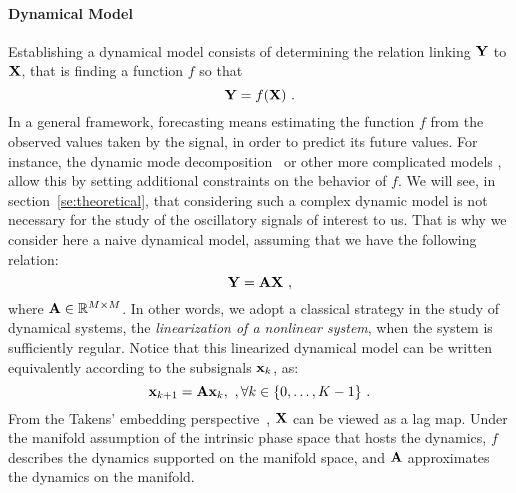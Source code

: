 \paragraph{Dynamical Model} 
Establishing a dynamical model consists of determining the relation linking ${\mathbf Y}$ to ${\mathbf X}$, that is finding a function $f$ so that
\begin{equation}
\bY = f(\bX)\ .
\label{eq:generic.model}
\end{equation}
In a general framework, forecasting means estimating the function $f$ from the observed values taken by the signal, in order to predict its future values. For instance, the dynamic mode decomposition~\cite{Schmid10dynamic,Williams15data} or other more complicated models \cite{Roberts13Gaussian,DeLivera11forecasting,west2006bayesian,vlachas2018data}, allow this by setting additional constraints on the behavior of $f$. We will see, in section~\ref{se:theoretical}, that considering such a complex dynamic model is not necessary for the study of the oscillatory signals of interest to us. That is why we consider here a naive dynamical model, assuming that we have the following relation:
\begin{equation}
\bY = \bA\bX\ ,
\label{eq:dyn.model}
\end{equation}
where ${\mathbf A}\in{\mathbb R}^{M\times M}$. In other words, we adopt a classical strategy in the study of dynamical systems, the {\em linearization of a nonlinear system}, when the system is sufficiently regular. Notice that this linearized dynamical model can be written equivalently according to the subsignals ${\mathbf x}_k$, as:
\begin{equation}
{\mathbf x}_{k+1} = {\mathbf A}{\mathbf x}_{k},\ ,\forall k\in\{0,\dots,K-1\}\ .
\end{equation}
%
{\color{blue}
From the Takens' embedding perspective~\cite{Takens81detecting}, ${\mathbf X}$ can be viewed as a lag map. Under the manifold assumption of the intrinsic phase space that hosts the dynamics, $f$ describes the dynamics supported on the manifold space, and ${\mathbf A}$ approximates the dynamics on the manifold.
}


